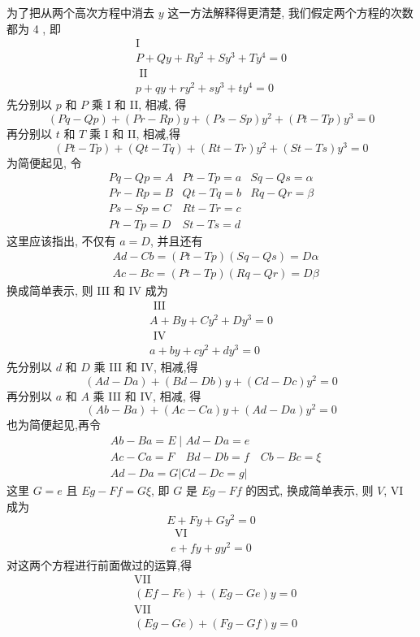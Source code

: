 为了把从两个高次方程中消去 $y$ 这一方法解释得更清楚, 我们假定两个方程的次数都为 4 , 即
\[
\begin{gathered}
\mathrm{I} \\
P+Q y+R y^{2}+S y^{3}+T y^{4}=0 \\
\text { II } \\
p+q y+r y^{2}+s y^{3}+t y^{4}=0
\end{gathered}
\]
先分别以 $p$ 和 $P$ 乘 $\mathrm{I}$ 和 II, 相减, 得
\[
(P q-Q p)+(P r-R p) y+(P s-S p) y^{2}+(P t-T p) y^{3}=0
\]
再分别以 $t$ 和 $T$ 乘 I 和 II, 相减,得
\[
(P t-T p)+(Q t-T q)+(R t-T r) y^{2}+(S t-T s) y^{3}=0
\]
为简便起见, 令
\[
\begin{array}{l|l|l}
P q-Q p=A & P t-T p=a & S q-Q s=\alpha \\
P r-R p=B & Q t-T q=b & R q-Q r=\beta \\
P s-S p=C & R t-T r=c & \\
P t-T p=D & S t-T s=d &
\end{array}
\]
这里应该指出, 不仅有 $a=D$, 并且还有
\[
\begin{aligned}
& A d-C b=(P t-T p)(S q-Q s)=D \alpha \\
& A c-B c=(P t-T p)(R q-Q r)=D \beta
\end{aligned}
\]
换成简单表示, 则 III 和 IV 成为
\[
\begin{gathered}
\text { III } \\
A+B y+C y^{2}+D y^{3}=0 \\
\text { IV } \\
a+b y+c y^{2}+d y^{3}=0
\end{gathered}
\]
先分别以 $d$ 和 $D$ 乘 III 和 IV, 相减,得
\[
(A d-D a)+(B d-D b) y+(C d-D c) y^{2}=0
\]
再分别以 $a$ 和 $A$ 乘 III 和 $\mathrm{IV}$, 相减, 得
\[
(A b-B a)+(A c-C a) y+(A d-D a) y^{2}=0
\]
也为简便起见,再令
\[
\begin{aligned}
& A b-B a=E \mid A d-D a=e \\
& A c-C a=F \quad B d-D b=f \quad C b-B c=\xi \\
& A d-D a=G|C d-D c=g|
\end{aligned}
\]
这里 $G=e$ 且 $E g-F f=G \xi$, 即 $G$ 是 $E g-F f$ 的因式, 换成简单表示, 则 $V$, VI 成为
\[
E+F y+G y^{2}=0
\]
\[
\begin{gathered}
\text { VI } \\
e+f y+g y^{2}=0
\end{gathered}
\]
对这两个方程进行前面做过的运算,得
\[
\begin{aligned}
& \mathrm{VII} \\
&(E f-F e)+(E g-G e) y=0 \\
& \mathrm{VII} \\
&(E g-G e)+(F g-G f) y=0
\end{aligned}
\]
